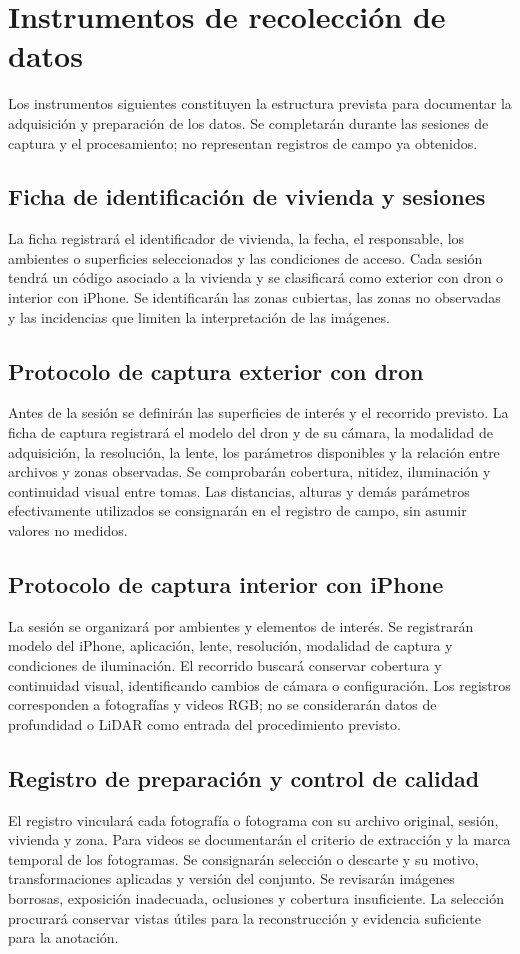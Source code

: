\documentclass[12pt,oneside]{report}
\begin{document}
\chapter{Instrumentos de recolección de datos}
Los instrumentos siguientes constituyen la estructura prevista para documentar la adquisición y preparación de los datos. Se completarán durante las sesiones de captura y el procesamiento; no representan registros de campo ya obtenidos.

\section{Ficha de identificación de vivienda y sesiones}
La ficha registrará el identificador de vivienda, la fecha, el responsable, los ambientes o superficies seleccionados y las condiciones de acceso. Cada sesión tendrá un código asociado a la vivienda y se clasificará como exterior con dron o interior con iPhone. Se identificarán las zonas cubiertas, las zonas no observadas y las incidencias que limiten la interpretación de las imágenes.

\section{Protocolo de captura exterior con dron}
Antes de la sesión se definirán las superficies de interés y el recorrido previsto. La ficha de captura registrará el modelo del dron y de su cámara, la modalidad de adquisición, la resolución, la lente, los parámetros disponibles y la relación entre archivos y zonas observadas. Se comprobarán cobertura, nitidez, iluminación y continuidad visual entre tomas. Las distancias, alturas y demás parámetros efectivamente utilizados se consignarán en el registro de campo, sin asumir valores no medidos.

\section{Protocolo de captura interior con iPhone}
La sesión se organizará por ambientes y elementos de interés. Se registrarán modelo del iPhone, aplicación, lente, resolución, modalidad de captura y condiciones de iluminación. El recorrido buscará conservar cobertura y continuidad visual, identificando cambios de cámara o configuración. Los registros corresponden a fotografías y videos RGB; no se considerarán datos de profundidad o LiDAR como entrada del procedimiento previsto.

\section{Registro de preparación y control de calidad}
El registro vinculará cada fotografía o fotograma con su archivo original, sesión, vivienda y zona. Para videos se documentarán el criterio de extracción y la marca temporal de los fotogramas. Se consignarán selección o descarte y su motivo, transformaciones aplicadas y versión del conjunto. Se revisarán imágenes borrosas, exposición inadecuada, oclusiones y cobertura insuficiente. La selección procurará conservar vistas útiles para la reconstrucción y evidencia suficiente para la anotación.
\end{document}
